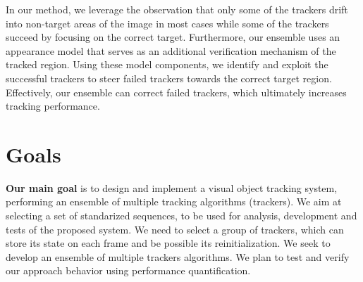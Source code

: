 \iffalse
Taking this into account, we consider an approach that combining the
virtues of different algorithms, while evading their weaknesses, could
outperform each single algorithm. Just as "two heads are better than one",
making trackers perform this task together in an unknown scenario, may
result in a higher level of performance and achievement, than could be
obtained individually. This is what in psychology states as "positive
interdependence", the ability of group members to encourage and
facilitate each other's efforts \cite{Johnson1998}.
\fi

In our method, we leverage the observation that only some of the trackers
drift into non-target areas of the image in most cases while some of the
trackers succeed by focusing on the correct target.
Furthermore, our ensemble uses an appearance model
that serves as an additional verification mechanism of the tracked region.
Using these model components, we identify and exploit the successful trackers
to steer failed trackers towards the correct target region. Effectively,
our ensemble can correct failed trackers, which ultimately increases
tracking performance.

\section{Goals} \label{sec::goals}

\textbf{Our main goal} is to design and implement a visual object tracking
system, performing an ensemble of multiple tracking algorithms (trackers). We
aim at selecting a set of standarized sequences, to be used for analysis, development and tests of the proposed system. We need to select a group of
trackers, which can store its state on each frame and be possible its
reinitialization. We seek to develop an ensemble of multiple trackers
algorithms. We plan to test and verify our approach behavior using performance
quantification.

